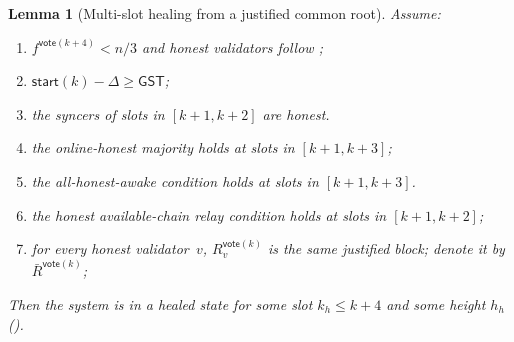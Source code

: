 \ifx\litemode\undefined\documentclass{article}\fi
\newcommand{\start}{\mathsf{start}}
\newcommand{\vote}{\mathsf{vote}}
\newcommand{\comm}[1]{\bar{#1}}
\newcommand{\getConfirmed}{\textsf{getConfirmed}\xspace}
\theoremstyle{plain}
\newtheorem{lemma}{Lemma}
\theoremstyle{definition}
\theoremstyle{remark}
\newcommand{\GST}{\ensuremath{\mathsf{GST}}}
\newcommand{\OHM}{online-honest majority\xspace}
\newcommand{\HAR}{honest available-chain relay\xspace}
\newcommand{\AHA}{all-honest-awake\xspace}
\begin{document}
\begin{lemma}[Multi-slot healing from a justified common root]\label{rev:lem:healing-from-justified-multi}
Assume:
\begin{enumerate}
  \item\label{rev:hfjm:f} $f^{\vote(k+4)} < n/3$ and honest validators follow ;
  \item\label{rev:hfjm:sync} $\start(k) - \Delta \geq \GST$;
  \item\label{rev:hfjm:syncers} the syncers of slots in $[k+1, k+2]$ are honest.
  \item\label{rev:hfjm:ohm} the \OHM holds at slots in $[k+1, k+3]$;
  \item\label{rev:hfjm:aha} the \AHA condition holds at slots in $[k+1, k+3]$.
  \item\label{rev:hfjm:har} the \HAR condition holds at slots in $[k+1, k+2]$;
  \item\label{rev:hfjm:r} for every honest validator~$v$, $R_v^{\vote(k)}$ is the same justified block; denote it by $\comm{R}^{\vote(k)}$;
\end{enumerate}
Then the system is in a healed state for some slot $k_h \leq k+4$ and some height $h_h$ ().
\end{lemma}
\end{document}
